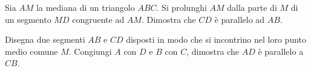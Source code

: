 \begin{multicols}{2}
\begin{esercizio}
\label{ese:3.38}
Sia \(AM\) la mediana di un triangolo \(ABC\). Si prolunghi \(AM\) dalla 
parte di \(M\) di un segmento \(MD\) congruente ad \(AM\). Dimostra che 
\(CD\) è parallelo ad \(AB\).
\end{esercizio}


\begin{esercizio}
\label{ese:3.42}
Disegna due segmenti \(AB\) e \(CD\) disposti in modo che si incontrino 
nel loro punto medio comune \(M\). Congiungi \(A\) con \(D\) e \(B\) con \(C\), 
dimostra che \(AD\) è parallelo a \(CB\).
\end{esercizio}

% 

% 

\end{multicols}


